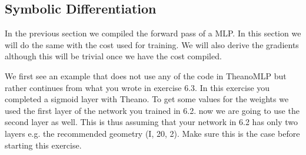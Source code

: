 \subsection{Symbolic Differentiation}
In the previous section we compiled the forward pass of a MLP. In this section
we will do the same with the cost used for training. We will also derive the
gradients although this will be trivial once we have the cost compiled.     
\begin{exercise}
We first see an example that does not use any of the code in TheanoMLP but
rather continues from what you wrote in exercise 6.3. In this exercise you
completed a sigmoid layer with Theano. To get some values for the weights we
used the first layer of the network you trained in 6.2. now we are going to use
the second layer as well. This is thus assuming that your network in 6.2 has
only two layers e.g. the recommended geometry (I, 20, 2). Make sure this is the
case before starting this exercise.  


\end{exercise}
